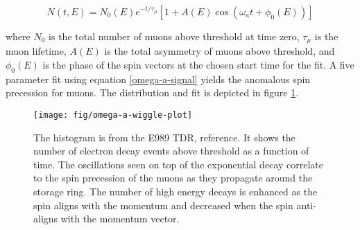 \begin{equation}
\label{eqn:omega-a-signal}
N(t, E) = N_0(E) e^{-t/\tau_\mu} \left[ 1 + A(E) \cos(\omega_a t + \phi_0(E))\right]
\end{equation}

where $N_0$ is the total number of muons above threshold at time zero, $\tau_\mu$ is the muon lifetime, $A(E)$ is the total asymmetry of muons above threshold, and $\phi_0(E)$ is the phase of the spin vectors at the chosen start time for the fit.  A five parameter fit using equation \ref{omega-a-signal} yields the anomalous spin precession for muons.  The distribution and fit is depicted in figure \ref{fig:omega-a-wiggle-plot}.

\begin{figure}
\label{fig:omega-a-wiggle-plot}
\texttt{[image: fig/omega-a-wiggle-plot]}
\caption{The histogram is from the E989 TDR, reference\cite{e989-tdr}.  It shows the number of electron decay events above threshold as a function of time.  The oscillations seen on top of the exponential decay correlate to the spin precession of the muons as they propagate around the storage ring.  The number of high energy decays is enhanced as the spin aligns with the momentum and decreased when the spin anti-aligns with the momentum vector.}
\end{figure}

